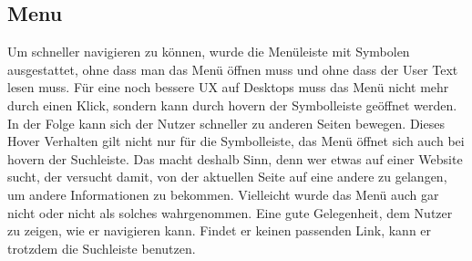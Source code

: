 \subsection{Menu}
Um schneller navigieren zu können, wurde die Menüleiste mit Symbolen ausgestattet, ohne dass man das Menü öffnen muss und ohne dass der User Text lesen muss. Für eine noch bessere UX auf Desktops muss das Menü nicht mehr durch einen Klick, sondern kann durch hovern der Symbolleiste geöffnet werden. In der Folge kann sich der Nutzer schneller zu anderen Seiten bewegen. Dieses Hover Verhalten gilt nicht nur für die Symbolleiste, das Menü öffnet sich auch bei hovern der Suchleiste. Das macht deshalb Sinn, denn wer etwas auf einer Website sucht, der versucht damit, von der aktuellen Seite auf eine andere zu gelangen, um andere Informationen zu bekommen. Vielleicht wurde das Menü auch gar nicht oder nicht als solches wahrgenommen. Eine gute Gelegenheit, dem Nutzer zu zeigen, wie er navigieren kann. Findet er keinen passenden Link, kann er trotzdem die Suchleiste benutzen.
